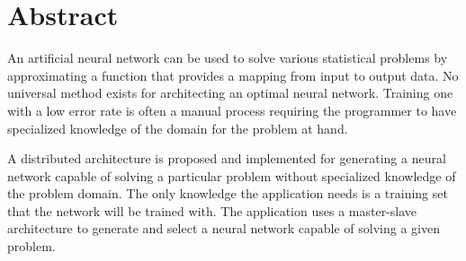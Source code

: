 \section*{Abstract}
An artificial neural network can be used to solve various statistical problems by approximating a function that provides a mapping from input to output data. No universal method exists for architecting an optimal neural network. Training one with a low error rate is often a manual process requiring the programmer to have specialized knowledge of the domain for the problem at hand.  

A distributed architecture is proposed and implemented for generating a neural network capable of solving a particular problem without specialized knowledge of the problem domain.  The only knowledge the application needs is a training set that the network will be trained with. The application uses a master-slave architecture to generate and select a neural network capable of solving a given problem.  


